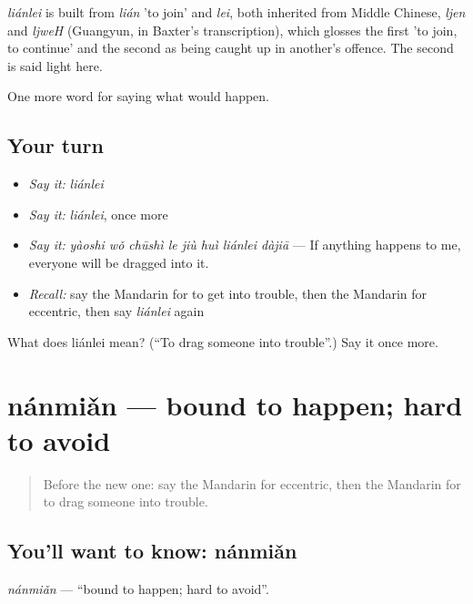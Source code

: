 \begin{cousinweb}
\emph{liánlei} is built from \emph{lián} 'to join' and \emph{lei}, both inherited from Middle Chinese, \emph{ljen} and \emph{ljweH} (Guangyun, in Baxter's transcription), which glosses the first 'to join, to continue' and the second as being caught up in another's offence. The second is said light here.
\end{cousinweb}

\begin{grammarlens}[title={What you've built}]
One more word for saying what would happen.
\end{grammarlens}

\subsection*{Your turn}
\begin{itemize}
\raggedright
  \item \emph{Say it:} \emph{liánlei}
  \item \emph{Say it:} \emph{liánlei}, once more
  \item \emph{Say it:} \emph{yàoshi wǒ chūshì le jiù huì liánlei dàjiā} — If anything happens to me, everyone will be dragged into it.
  \item \emph{Recall:} say the Mandarin for to get into trouble, then the Mandarin for eccentric, then say \emph{liánlei} again
\end{itemize}

\begin{tcolorbox}[breakable,colback=teal!4,colframe=teal!35!black,title={Before you move on}]
What does liánlei mean? (\textquotedblleft{}To drag someone into trouble\textquotedblright{}.) Say it once more.
\end{tcolorbox}
\section[nánmiǎn]{nánmiǎn — bound to happen; hard to avoid}

\label{lesson:ZH-C540-nanmian}



\begin{quote}
Before the new one: say the Mandarin for eccentric, then the Mandarin for to drag someone into trouble.
\end{quote}

\subsection*{You'll want to know: nánmiǎn}
\emph{nánmiǎn} — \textquotedblleft{}bound to happen; hard to avoid\textquotedblright{}.

